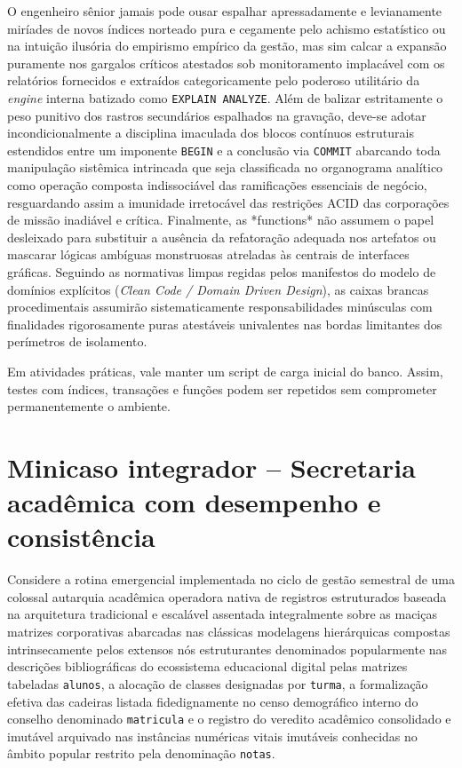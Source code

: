 O engenheiro sênior jamais pode ousar espalhar apressadamente e levianamente miríades de novos índices norteado pura e cegamente pelo achismo estatístico ou na intuição ilusória do empirismo empírico da gestão, mas sim calcar a expansão puramente nos gargalos críticos atestados sob monitoramento implacável com os relatórios fornecidos e extraídos categoricamente pelo poderoso utilitário da \textit{engine} interna batizado como \texttt{EXPLAIN ANALYZE}. Além de balizar estritamente o peso punitivo dos rastros secundários espalhados na gravação, deve-se adotar incondicionalmente a disciplina imaculada dos blocos contínuos estruturais estendidos entre um imponente \texttt{BEGIN} e a conclusão via \texttt{COMMIT} abarcando toda manipulação sistêmica intrincada que seja classificada no organograma analítico como operação composta indissociável das ramificações essenciais de negócio, resguardando assim a imunidade irretocável das restrições ACID das corporações de missão inadiável e crítica. Finalmente, as *functions* não assumem o papel desleixado para substituir a ausência da refatoração adequada nos artefatos ou mascarar lógicas ambíguas monstruosas atreladas às centrais de interfaces gráficas. Seguindo as normativas limpas regidas pelos manifestos do modelo de domínios explícitos (\textit{Clean Code / Domain Driven Design}), as caixas brancas procedimentais assumirão sistematicamente responsabilidades minúsculas com finalidades rigorosamente puras atestáveis univalentes nas bordas limitantes dos perímetros de isolamento.

\begin{quadro_dica}
Em atividades práticas, vale manter um script de carga inicial do banco. Assim, testes com índices, transações e funções podem ser repetidos sem comprometer permanentemente o ambiente.
\end{quadro_dica}

\section{Minicaso integrador -- Secretaria acadêmica com desempenho e consistência}

Considere a rotina emergencial implementada no ciclo de gestão semestral de uma colossal autarquia acadêmica operadora nativa de registros estruturados baseada na arquitetura tradicional e escalável assentada integralmente sobre as maciças matrizes corporativas abarcadas nas clássicas modelagens hierárquicas compostas intrinsecamente pelos extensos nós estruturantes denominados popularmente nas descrições bibliográficas do ecossistema educacional digital pelas matrizes tabeladas \texttt{alunos}, a alocação de classes designadas por \texttt{turma}, a formalização efetiva das cadeiras listada fidedignamente no censo demográfico interno do conselho denominado \texttt{matricula} e o registro do veredito acadêmico consolidado e imutável arquivado nas instâncias numéricas vitais imutáveis conhecidas no âmbito popular restrito pela denominação \texttt{notas}. 

